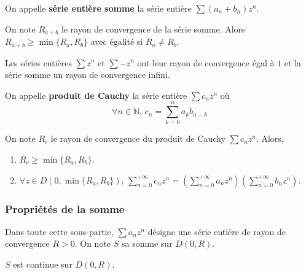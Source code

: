   \begin{definition}
    On appelle \textbf{série entière somme} la série entière $\sum (a_n + b_n) z^n$.
  \end{definition}

  \begin{proposition}
    On note $R_{a+b}$ le rayon de convergence de la série somme. Alors $R_{a+b} \geq \min \{R_a, R_b\}$ avec égalité si $R_a \neq R_b$.
  \end{proposition}


  \begin{example}
    Les séries entières $\sum z^n$ et $\sum -z^n$ ont leur rayon de convergence égal à $1$ et la série somme un rayon de convergence infini.
  \end{example}


  \begin{definition}
    On appelle \textbf{produit de Cauchy} la série entière $\sum c_n z^n$ où
    \[ \forall n \in \mathbb{N}, \, c_n = \sum_{k=0}^n a_k b_{n-k} \]
  \end{definition}

  \begin{proposition}
    On note $R_{c}$ le rayon de convergence du produit de Cauchy $\sum c_n z^n$. Alors,
    \begin{enumerate}[label={\bfseries(\roman*)}]
      \item $R_c \geq \min \{R_a, R_b\}$.
      \item $\forall z \in D(0, \min \{R_a, R_b\}), \, \sum_{n = 0}^{+\infty} c_n z^n = (\sum_{n = 0}^{+\infty} a_n z^n) (\sum_{n = 0}^{+\infty} b_n z^n)$.
    \end{enumerate}
  \end{proposition}

  \subsubsection{Propriétés de la somme}


  Dans toute cette sous-partie, $\sum a_n z^n$ désigne une série entière de rayon de convergence $R > 0$. On note $S$ sa somme sur $D(0,R)$.

  \begin{proposition}
    $S$ est continue sur $D(0,R)$.
  \end{proposition}

